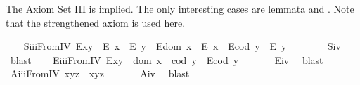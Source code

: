 \begin{isabellebody}
%
\endisadelimproof
%
\begin{isamarkuptext}%
The Axiom Set III is implied. The only interesting cases are 
 lemmata  and . Note that the strengthened 
 axiom  is used here.%
\end{isamarkuptext}\isamarkuptrue%
\ \ \isamarkupfalse%
\ S\isactrlsub i\isactrlsub i\isactrlsub iFromIV{\isacharcolon}\ {\isachardoublequoteopen}{\isacharparenleft}E{\isacharparenleft}x{\isasymcdot}y{\isacharparenright}\ \isactrlbold {\isasymrightarrow}\ {\isacharparenleft}E\ x\ \isactrlbold {\isasymand}\ E\ y{\isacharparenright}{\isacharparenright}\ \isactrlbold {\isasymand}\ {\isacharparenleft}E{\isacharparenleft}dom\ x{\isacharparenright}\ \isactrlbold {\isasymrightarrow}\ E\ x{\isacharparenright}\ \isactrlbold {\isasymand}\ {\isacharparenleft}E{\isacharparenleft}cod\ y{\isacharparenright}\ \isactrlbold {\isasymrightarrow}\ E\ y{\isacharparenright}{\isachardoublequoteclose}\ \ \isanewline
%
\isadelimproof
\ \ \ \ %
\endisadelimproof
%
\isatagproof
{}\isamarkupfalse%
\ S\isactrlsub i\isactrlsub v\ \isamarkupfalse%
\ blast%
\endisatagproof
{\isafoldproof}%
%
\isadelimproof
\isanewline
%
\endisadelimproof
\ \ \isamarkupfalse%
\ E\isactrlsub i\isactrlsub i\isactrlsub iFromIV{\isacharcolon}\ {\isachardoublequoteopen}E{\isacharparenleft}x{\isasymcdot}y{\isacharparenright}\ \isactrlbold {\isasymleftarrow}\ {\isacharparenleft}dom\ x\ {\isasymcong}\ cod\ y\ \isactrlbold {\isasymand}\ {\isacharparenleft}E{\isacharparenleft}cod\ y{\isacharparenright}{\isacharparenright}{\isacharparenright}{\isachardoublequoteclose}\ \isanewline
%
\isadelimproof
\ \ \ \ %
\endisadelimproof
%
\isatagproof
{}\isamarkupfalse%
\ E\isactrlsub i\isactrlsub v\ \isamarkupfalse%
\ blast%
\endisatagproof
{\isafoldproof}%
%
\isadelimproof
\isanewline
%
\endisadelimproof
\ \ \isamarkupfalse%
\ A\isactrlsub i\isactrlsub i\isactrlsub iFromIV{\isacharcolon}\ {\isachardoublequoteopen}x{\isasymcdot}{\isacharparenleft}y{\isasymcdot}z{\isacharparenright}\ {\isasymcong}\ {\isacharparenleft}x{\isasymcdot}y{\isacharparenright}{\isasymcdot}z{\isachardoublequoteclose}\ \isanewline
%
\isadelimproof
\ \ \ \ %
\endisadelimproof
%
\isatagproof
{}\isamarkupfalse%
\ A\isactrlsub i\isactrlsub v\ \isamarkupfalse%
\ blast%
\endisatagproof
{\isafoldproof}%
%
\isadelimproof
\isanewline

\end{isabellebody}
